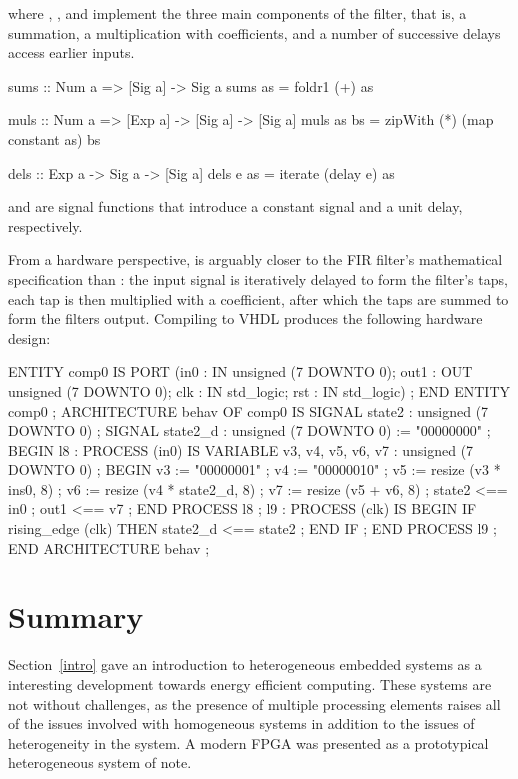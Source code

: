 \documentclass[../paper.tex]{subfiles}
\begin{document}
\noindent where , , and  implement the three main components of the filter, that is, a summation, a multiplication with coefficients, and a number of successive delays access earlier inputs.

\begin{code}
sums :: Num a => [Sig a] -> Sig a
sums as = foldr1 (+) as

muls :: Num a => [Exp a] -> [Sig a] -> [Sig a]
muls as bs = zipWith (*) (map constant as) bs

dels :: Exp a -> Sig a -> [Sig a]
dels e as = iterate (delay e) as
\end{code}

\noindent {} and  are signal functions that introduce a constant signal and a unit delay, respectively.

From a hardware perspective,  is arguably closer to the FIR filter's mathematical specification than : the input signal is iteratively delayed to form the filter's taps, each tap is then multiplied with a coefficient, after which the taps are summed to form the filters output. Compiling  to VHDL produces the following hardware design:

\begin{code}
ENTITY comp0 IS
  PORT (in0 : IN unsigned (7 DOWNTO 0);
        out1 : OUT unsigned (7 DOWNTO 0);
        clk : IN std_logic;
        rst : IN std_logic) ;
END ENTITY comp0 ;
ARCHITECTURE behav OF comp0 IS
  SIGNAL state2 : unsigned (7 DOWNTO 0) ;
  SIGNAL state2_d : unsigned (7 DOWNTO 0) := "00000000" ;
BEGIN
  l8 :
    PROCESS (in0) IS
      VARIABLE v3, v4, v5, v6, v7 : unsigned (7 DOWNTO 0) ; 
    BEGIN
      v3 := "00000001" ;
      v4 := "00000010" ;
      v5 := resize (v3 * ins0, 8) ;
      v6 := resize (v4 * state2_d, 8) ;
      v7 := resize (v5 + v6, 8) ;
      state2 <== in0 ;
      out1 <== v7 ;
    END PROCESS l8 ;
  l9 :
    PROCESS (clk) IS
    BEGIN
      IF rising_edge (clk) THEN
        state2_d <== state2 ;
      END IF ;
    END PROCESS l9 ;
END ARCHITECTURE behav ;
\end{code}

\section{Summary}

Section~\ref{intro} gave an introduction to heterogeneous embedded systems as a interesting development towards energy efficient computing. These systems are not without challenges, as the presence of multiple processing elements raises all of the issues involved with homogeneous systems in addition to the issues of heterogeneity in the system. A modern FPGA was presented as a prototypical heterogeneous system of note.
\end{document}

